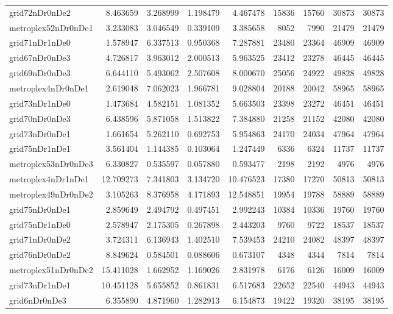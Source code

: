 \begin{longtable}{|l|r|r|r|r|r|r|r|r|}
grid72nDr0nDe2 & 8.463659 & 3.268999 & 1.198479 & 4.467478 & 15836 & 15760 & 30873 & 30873 \\
metroplex52nDr0nDe1 & 3.233083 & 3.046549 & 0.339109 & 3.385658 & 8052 & 7990 & 21479 & 21479 \\
grid71nDr1nDe0 & 1.578947 & 6.337513 & 0.950368 & 7.287881 & 23480 & 23364 & 46909 & 46909 \\
grid67nDr0nDe3 & 4.726817 & 3.963012 & 2.000513 & 5.963525 & 23412 & 23278 & 46445 & 46445 \\
grid69nDr0nDe3 & 6.644110 & 5.493062 & 2.507608 & 8.000670 & 25056 & 24922 & 49828 & 49828 \\
metroplex4nDr0nDe1 & 2.619048 & 7.062023 & 1.966781 & 9.028804 & 20188 & 20042 & 58965 & 58965 \\
grid73nDr1nDe0 & 1.473684 & 4.582151 & 1.081352 & 5.663503 & 23398 & 23272 & 46451 & 46451 \\
grid70nDr0nDe3 & 6.438596 & 5.871058 & 1.513822 & 7.384880 & 21258 & 21152 & 42080 & 42080 \\
grid73nDr0nDe1 & 1.661654 & 5.262110 & 0.692753 & 5.954863 & 24170 & 24034 & 47964 & 47964 \\
grid75nDr1nDe1 & 3.561404 & 1.144385 & 0.103064 & 1.247449 & 6336 & 6324 & 11737 & 11737 \\
metroplex53nDr0nDe3 & 6.330827 & 0.535597 & 0.057880 & 0.593477 & 2198 & 2192 & 4976 & 4976 \\
metroplex4nDr1nDe1 & 12.709273 & 7.341803 & 3.134720 & 10.476523 & 17380 & 17270 & 50813 & 50813 \\
metroplex49nDr0nDe2 & 3.105263 & 8.376958 & 4.171893 & 12.548851 & 19954 & 19788 & 58889 & 58889 \\
grid75nDr0nDe1 & 2.859649 & 2.494792 & 0.497451 & 2.992243 & 10384 & 10336 & 19760 & 19760 \\
grid75nDr1nDe0 & 2.578947 & 2.175305 & 0.267898 & 2.443203 & 9760 & 9722 & 18537 & 18537 \\
grid71nDr0nDe2 & 3.724311 & 6.136943 & 1.402510 & 7.539453 & 24210 & 24082 & 48397 & 48397 \\
grid76nDr0nDe2 & 8.849624 & 0.584501 & 0.088606 & 0.673107 & 4348 & 4344 & 7814 & 7814 \\
metroplex51nDr0nDe2 & 15.411028 & 1.662952 & 1.169026 & 2.831978 & 6176 & 6126 & 16009 & 16009 \\
grid73nDr1nDe1 & 10.451128 & 5.655852 & 0.861831 & 6.517683 & 22652 & 22540 & 44943 & 44943 \\
grid6nDr0nDe3 & 6.355890 & 4.871960 & 1.282913 & 6.154873 & 19422 & 19320 & 38195 & 38195 \\

\end{longtable}
